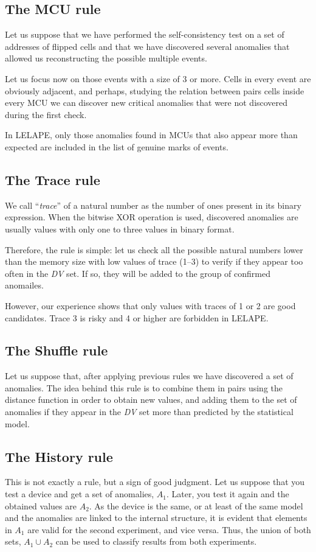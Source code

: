 \subsection{The MCU rule}\label{Subsec:MCURule}
%
Let us suppose that we have performed the self-consistency test on a set of addresses of flipped cells and that we have discovered several anomalies that allowed us reconstructing the possible multiple events. 

Let us focus now on those events with a size of 3 or more. Cells in every event are obviously adjacent, and perhaps, studying the relation between pairs cells inside every MCU we can discover new critical anomalies that were not discovered during the first check.

In LELAPE, only those anomalies found in MCUs that also appear more than expected are included in the list of genuine marks of events.
%
\subsection{The Trace rule}\label{Subsec:TraceRule}
% 
We call ``\textit{trace}'' of a natural number as the number of ones present in its binary expression. When the bitwise XOR operation is used, discovered anomalies are usually values with only one to three values in binary format. 

Therefore, the rule is simple: let us check all the possible natural numbers lower than the memory size with low values of trace (1--3) to verify if they appear too often in the \textit{DV} set. If so, they will be added to the group of confirmed anomailes. 

However, our experience shows that only values with traces of 1 or 2 are good candidates. Trace 3 is risky and 4 or higher are forbidden in LELAPE.
%
\subsection{The Shuffle rule}\label{Subsec:ShuffleRule}
%
Let us suppose that, after applying previous rules we have discovered a set of anomalies. The idea behind this rule is to combine them in pairs using the distance function in order to obtain new values, and adding them to the set of anomalies if they appear in the \textit{DV} set more than predicted by the statistical model.
%
\subsection{The History rule}
%
This is not exactly a rule, but a sign of good judgment. Let us suppose that you test a device and get a set of anomalies, \(A_1\). Later, you test it again and the obtained values are \(A_2\). As the device is the same, or at least of the same model and the anomalies are linked to the internal structure, it is evident that elements in \(A_1\) are valid for the second experiment, and vice versa. Thus, the union of both sets, \(A_1 \cup A_2\) can be used to classify results from both experiments.

